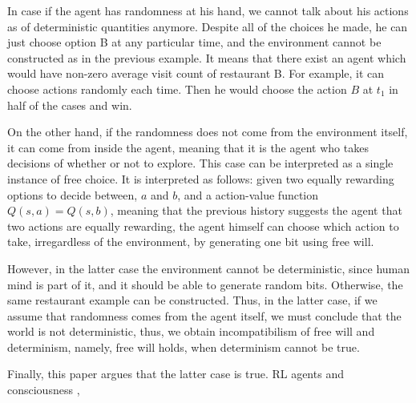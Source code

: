 \documentclass[a4paper]{article}
\begin{document}
In case if the agent has randomness at his hand, we cannot talk about his actions as of deterministic quantities anymore. Despite all of the choices he made, he can just choose option B at any particular time, and the environment cannot be constructed as in the previous example. It means that there exist an agent which would have non-zero average visit count of restaurant B. For example, it can choose actions randomly each time. Then he would choose the action $B$ at $t_1$ in half of the cases and win.


On the other hand, if the randomness does not come from the environment itself, it can come from inside the agent, meaning that it is the agent who takes decisions of whether or not to explore. This case can be interpreted as a single instance of free choice. It is interpreted as follows: given two equally rewarding options to decide between, $a$ and $b$, and a action-value function \cite{sutton} $Q(s, a)=Q(s, b)$, meaning that the previous history suggests the agent that two actions are equally rewarding, the agent himself can choose which action to take, irregardless of the environment, by generating one bit using free will.

However, in the latter case the environment cannot be deterministic, since human mind is part of it, and it should be able to generate random bits. Otherwise, the same restaurant example can be constructed. Thus, in the latter case, if we assume that randomness comes from the agent itself, we must conclude that the world is not deterministic, thus, we obtain incompatibilism of free will and determinism, namely, free will holds, when determinism cannot be true.

Finally, this paper argues that the latter case is true. RL agents and consciousness \cite{rlmorality1}, \cite{rlmorality2}
\end{document}
